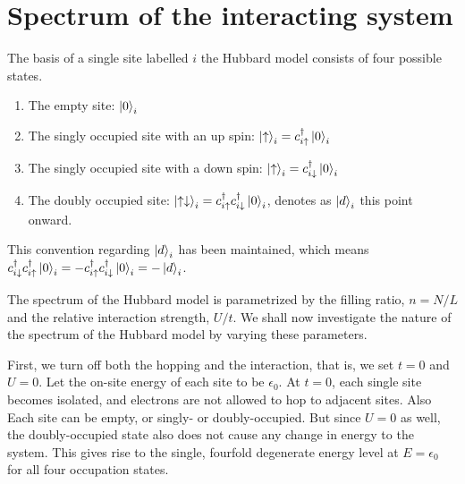 \documentclass[]{report}
\begin{document}
\section{Spectrum of the interacting system}
The basis of a single site labelled $ i $ the Hubbard model consists of four possible states.
\begin{enumerate}
\item The empty site: $ \ket{0}_i $
\item The singly occupied site with an up spin: $ \ket{\uparrow}_i = c^{\dagger}_{i \uparrow} \ket{0}_i$ 
\item The singly occupied site with a down spin: $ \ket{\uparrow}_i = c^{\dagger}_{i \downarrow} \ket{0}_i$
\item The doubly occupied site: $ \ket{\uparrow\downarrow}_i = c^{\dagger}_{i \uparrow} c^{\dagger}_{i \downarrow} \ket{0}_i $, denotes as $ \ket{d}_i $ this point onward.
\end{enumerate}

This convention regarding $ \ket{d}_i $ has been maintained, which means $ c^{\dagger}_{i \downarrow} c^{\dagger}_{i \uparrow}  \ket{0}_i  = - c^{\dagger}_{i \uparrow} c^{\dagger}_{i \downarrow} \ket{0}_i = -\ket{d}_i $.

The spectrum of the Hubbard model is parametrized by the filling ratio, $ n = N/L $ and the relative interaction strength, $ U/t $. We shall now investigate the nature of the spectrum of the Hubbard model by varying these parameters.

First, we turn off both the hopping and the interaction, that is, we set $ t=0 $ and $ U=0 $. Let the on-site energy of each site to be $ \epsilon_0$. At $ t=0 $, each single site becomes isolated, and electrons are not allowed to hop to adjacent sites. Also Each site can be empty, or singly- or doubly-occupied. But since $ U=0 $ as well, the doubly-occupied state also does not cause any change in energy to the system. This gives rise to the single, fourfold degenerate energy level at $ E=\epsilon_0 $ for all  four occupation states.
\end{document}
